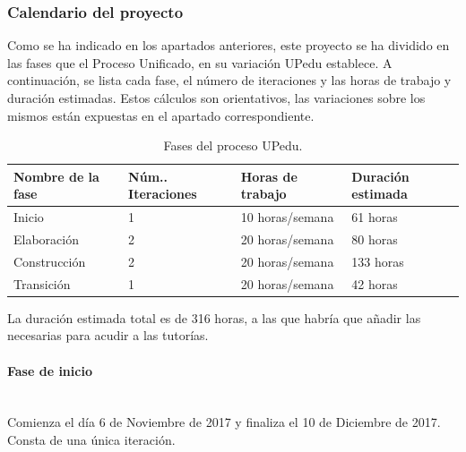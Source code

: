 \documentclass[twoside]{report}
\begin{document}
\subsubsection{Calendario del proyecto}

Como se ha indicado en los apartados anteriores, este proyecto se ha dividido en las fases que el Proceso Unificado, en su variación UPedu\cite{upedu} establece. A continuación, se lista cada fase, el número de iteraciones y las horas de trabajo y duración estimadas. Estos cálculos son orientativos, las variaciones sobre los mismos están expuestas en el apartado correspondiente.

\begin{table}[H]
\centering
\begin{tabular}{|l|l|l|l|}
\hline
Nombre de la fase & Núm.. Iteraciones & Horas de trabajo & Duración estimada \\ \hline
Inicio            & 1                 & 10 horas/semana  & 61 horas       \\ \hline
Elaboración       & 2                 & 20 horas/semana  & 80 horas    \\ \hline
Construcción      & 2                 & 20 horas/semana  & 133 horas       \\ \hline
Transición        & 1                 & 20 horas/semana   & 42 horas       \\ \hline
\end{tabular}
\caption{Fases del proceso UPedu.}
\end{table}

La duración estimada total es de 316 horas, a las que habría que añadir las necesarias para acudir a las tutorías.

\paragraph{Fase de inicio}\mbox{}\\

Comienza el día 6 de Noviembre de 2017 y finaliza el 10 de Diciembre de 2017. Consta de una única iteración. 
\end{document}
